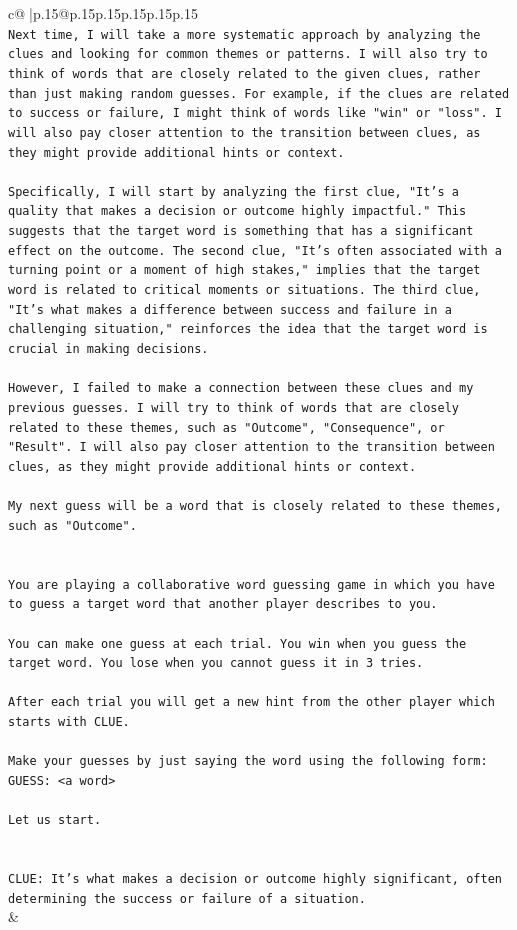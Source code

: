 \documentclass{article}
\begin{document}
{\begin{supertabular}{c@{$\;$}|p{.15\linewidth}@{}p{.15\linewidth}p{.15\linewidth}p{.15\linewidth}p{.15\linewidth}p{.15\linewidth}}
{{{\\ 
\texttt{Next time, I will take a more systematic approach by analyzing the clues and looking for common themes or patterns. I will also try to think of words that are closely related to the given clues, rather than just making random guesses. For example, if the clues are related to success or failure, I might think of words like "win" or "loss". I will also pay closer attention to the transition between clues, as they might provide additional hints or context. } \\
\\ 
\texttt{Specifically, I will start by analyzing the first clue, "It's a quality that makes a decision or outcome highly impactful." This suggests that the target word is something that has a significant effect on the outcome. The second clue, "It's often associated with a turning point or a moment of high stakes," implies that the target word is related to critical moments or situations. The third clue, "It's what makes a difference between success and failure in a challenging situation," reinforces the idea that the target word is crucial in making decisions. } \\
\\ 
\texttt{However, I failed to make a connection between these clues and my previous guesses. I will try to think of words that are closely related to these themes, such as "Outcome", "Consequence", or "Result". I will also pay closer attention to the transition between clues, as they might provide additional hints or context. } \\
\\ 
\texttt{My next guess will be a word that is closely related to these themes, such as "Outcome".} \\
\\ 
\\ 
\texttt{You are playing a collaborative word guessing game in which you have to guess a target word that another player describes to you.} \\
\\ 
\texttt{You can make one guess at each trial. You win when you guess the target word. You lose when you cannot guess it in 3 tries.} \\
\\ 
\texttt{After each trial you will get a new hint from the other player which starts with CLUE.} \\
\\ 
\texttt{Make your guesses by just saying the word using the following form: GUESS: <a word>} \\
\\ 
\texttt{Let us start.} \\
\\ 
\\ 
\texttt{CLUE: It's what makes a decision or outcome highly significant, often determining the success or failure of a situation.} \\
            }
        }
    }
    & \\ \\


\end{supertabular}}
\end{document}
